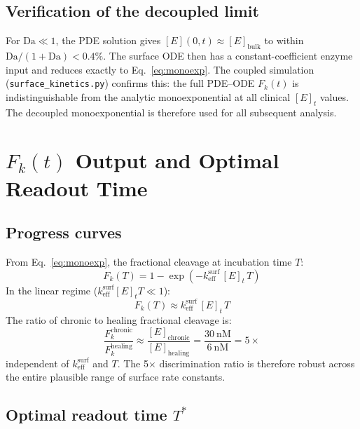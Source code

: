 \documentclass[10pt,a4paper]{article}
\numberwithin{equation}{section}
\newcommand{\keff}{k_{\text{eff}}}
\newcommand{\Da}{\mathrm{Da}}
\begin{document}
\subsection{Verification of the decoupled limit}

For $\Da \ll 1$, the PDE solution gives $[E](0,t) \approx [E]_{\text{bulk}}$ to
within $\Da/(1+\Da) < 0.4\%$. The surface ODE then has a constant-coefficient
enzyme input and reduces exactly to Eq.~\eqref{eq:monoexp}. The coupled simulation
(\texttt{surface\_kinetics.py}) confirms this: the full PDE--ODE $F_k(t)$ is
indistinguishable from the analytic monoexponential at all clinical $[E]_t$ values.
The decoupled monoexponential is therefore used for all subsequent analysis.

\section{$F_k(t)$ Output and Optimal Readout Time}
\label{sec:Fk}

\subsection{Progress curves}

From Eq.~\eqref{eq:monoexp}, the fractional cleavage at incubation time $T$:
\begin{equation}
  \label{eq:Fk}
  F_k(T) = 1 - \exp\!\left(-\keff^{\text{surf}}\,[E]_t\,T\right)
\end{equation}
In the linear regime ($\keff^{\text{surf}}[E]_t T \ll 1$):
\begin{equation}
  \label{eq:Fk_linear}
  F_k(T) \approx \keff^{\text{surf}}\,[E]_t\,T
\end{equation}
The ratio of chronic to healing fractional cleavage is:
\begin{equation}
  \label{eq:ratio_linear}
  \frac{F_k^{\text{chronic}}}{F_k^{\text{healing}}} \approx
  \frac{[E]_{\text{chronic}}}{[E]_{\text{healing}}} = \frac{30\ \text{nM}}{6\ \text{nM}} = 5\times
\end{equation}
independent of $\keff^{\text{surf}}$ and $T$. The 5$\times$ discrimination ratio
is therefore robust across the entire plausible range of surface rate constants.

\subsection{Optimal readout time $T^*$}
\end{document}
